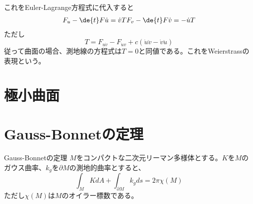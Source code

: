         これをEuler-Lagrange方程式に代入すると
        \begin{align*}
            F_{u} - \de{t}F{\dot{u}} = \dot{v}T
            F_{v} - \de{t}F{\dot{v}} = -\dot{u}T
        \end{align*}
        ただし
            \[T = F_{u\dot{v}} - F_{\dot{u}v} + c(\dot{u}\ddot{v} - \dot{v}\ddot{u})\]
        従って曲面の場合、測地線の方程式は$T = 0$と同値である。これをWeierstrassの表現という。
            
\section{極小曲面}        
\section{Gauss-Bonnetの定理}
    \begin{thm}{Gauss-Bonnetの定理}
        $M$をコンパクトな二次元リーマン多様体とする。$K$を$M$のガウス曲率、$k_g$を$\partial M$の測地的曲率とすると、
            \[\int_M KdA + \int_{\partial M} k_gds = 2\pi\chi(M)\]
        ただし$\chi(M)$は$M$のオイラー標数である。
    \end{thm}